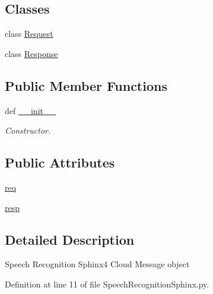 \subsection*{Classes}
\begin{DoxyCompactItemize}
\item 
class \hyperlink{classRappCloud_1_1CloudMsgs_1_1SpeechRecognitionSphinx_1_1SpeechRecognitionSphinx_1_1Request}{Request}
\item 
class \hyperlink{classRappCloud_1_1CloudMsgs_1_1SpeechRecognitionSphinx_1_1SpeechRecognitionSphinx_1_1Response}{Response}
\end{DoxyCompactItemize}
\subsection*{Public Member Functions}
\begin{DoxyCompactItemize}
\item 
def \hyperlink{classRappCloud_1_1CloudMsgs_1_1SpeechRecognitionSphinx_1_1SpeechRecognitionSphinx_ac88123f38ac540e49819cef2324fc588}{\-\_\-\-\_\-init\-\_\-\-\_\-}
\begin{DoxyCompactList}\small\item\em Constructor. \end{DoxyCompactList}\end{DoxyCompactItemize}
\subsection*{Public Attributes}
\begin{DoxyCompactItemize}
\item 
\hyperlink{classRappCloud_1_1CloudMsgs_1_1SpeechRecognitionSphinx_1_1SpeechRecognitionSphinx_aa5378aa2d3852fb0610c73b5a74a862b}{req}
\item 
\hyperlink{classRappCloud_1_1CloudMsgs_1_1SpeechRecognitionSphinx_1_1SpeechRecognitionSphinx_ac5ba32178af1389bba6b75a6bf3982e7}{resp}
\end{DoxyCompactItemize}


\subsection{Detailed Description}
\begin{DoxyVerb}Speech Recognition Sphinx4 Cloud Message object \end{DoxyVerb}
 

Definition at line 11 of file Speech\-Recognition\-Sphinx.\-py.



